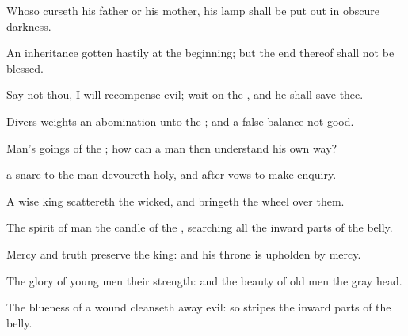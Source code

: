{Whoso
curseth his
father or his
mother, his
lamp shall be put
out in
obscure
darkness.

An
inheritance
{} gotten
hastily at the
beginning; but the
end thereof shall not be
blessed.

Say not thou, I will
recompense
evil;
{} wait
on the
{}, and he shall
save thee.

Divers
weights
{} an
abomination unto the
{}; and a
false
balance
{} not
good.

Man’s
goings
{} of the
{}; how can a
man then
understand his own
way?

 a
snare to the
man
{}
devoureth
{}
holy, and
after
vows to make
enquiry.

A
wise
king
scattereth the
wicked, and
bringeth the
wheel over them.

The
spirit of
man
{} the
candle of the
{},
searching all the inward
parts of the
belly.

Mercy and
truth
preserve the
king: and his
throne is
upholden by
mercy.

The
glory of young
men
{} their
strength: and the
beauty of old
men
{} the gray
head.

The
blueness of a
wound
cleanseth away
evil: so
{}
stripes the inward
parts of the
belly.




\par }
